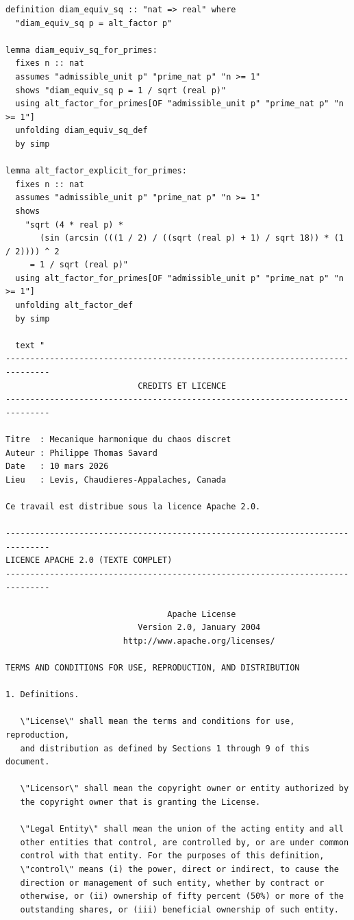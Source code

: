 \documentclass[12pt,a4paper]{article}
\begin{document}
\begin{verbatim}
definition diam_equiv_sq :: "nat => real" where
  "diam_equiv_sq p = alt_factor p"

lemma diam_equiv_sq_for_primes:
  fixes n :: nat
  assumes "admissible_unit p" "prime_nat p" "n >= 1"
  shows "diam_equiv_sq p = 1 / sqrt (real p)"
  using alt_factor_for_primes[OF "admissible_unit p" "prime_nat p" "n >= 1"]
  unfolding diam_equiv_sq_def
  by simp

lemma alt_factor_explicit_for_primes:
  fixes n :: nat
  assumes "admissible_unit p" "prime_nat p" "n >= 1"
  shows
    "sqrt (4 * real p) *
       (sin (arcsin (((1 / 2) / ((sqrt (real p) + 1) / sqrt 18)) * (1 / 2)))) ^ 2
     = 1 / sqrt (real p)"
  using alt_factor_for_primes[OF "admissible_unit p" "prime_nat p" "n >= 1"]
  unfolding alt_factor_def
  by simp

  text "
-------------------------------------------------------------------------------
                           CREDITS ET LICENCE
-------------------------------------------------------------------------------

Titre  : Mecanique harmonique du chaos discret
Auteur : Philippe Thomas Savard
Date   : 10 mars 2026
Lieu   : Levis, Chaudieres-Appalaches, Canada

Ce travail est distribue sous la licence Apache 2.0.

-------------------------------------------------------------------------------
LICENCE APACHE 2.0 (TEXTE COMPLET)
-------------------------------------------------------------------------------

                                 Apache License
                           Version 2.0, January 2004
                        http://www.apache.org/licenses/

TERMS AND CONDITIONS FOR USE, REPRODUCTION, AND DISTRIBUTION

1. Definitions.

   \"License\" shall mean the terms and conditions for use, reproduction,
   and distribution as defined by Sections 1 through 9 of this document.

   \"Licensor\" shall mean the copyright owner or entity authorized by
   the copyright owner that is granting the License.

   \"Legal Entity\" shall mean the union of the acting entity and all
   other entities that control, are controlled by, or are under common
   control with that entity. For the purposes of this definition,
   \"control\" means (i) the power, direct or indirect, to cause the
   direction or management of such entity, whether by contract or
   otherwise, or (ii) ownership of fifty percent (50%) or more of the
   outstanding shares, or (iii) beneficial ownership of such entity.


\end{verbatim}
\end{document}
